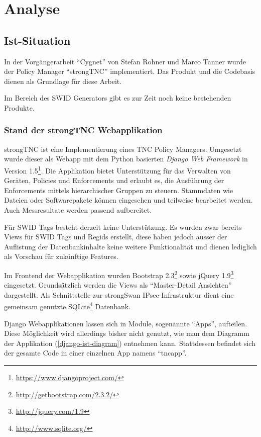 \chapter{Analyse}

\section{Ist-Situation}

In der Vorgängerarbeit \enquote{Cygnet} von Stefan Rohner und Marco
Tanner\cite{cygnet:2013} wurde der Policy Manager \enquote{strongTNC}
implementiert. Das Produkt und die Codebasis dienen als Grundlage
für diese Arbeit.

Im Bereich des SWID Generators gibt es zur Zeit noch keine bestehenden Produkte.

\subsection{Stand der strongTNC Webapplikation} 
\label{analyse:stand}

strongTNC ist eine Implementierung eines TNC Policy Managers. Umgesetzt wurde
dieser als Webapp mit dem Python basierten \textit{Django Web Framework} in
Version 1.5\footnote{\url{https://www.djangoproject.com/}}. Die Applikation
bietet Unterstützung für das Verwalten von Geräten, Policies und Enforcements
und erlaubt es, die Ausführung der Enforcements mittels hierarchischer Gruppen
zu steuern. Stammdaten wie Dateien oder Softwarepakete können eingesehen und
teilweise bearbeitet werden. Auch Messresultate werden passend aufbereitet.

Für SWID Tags besteht derzeit keine Unterstützung. Es wurden zwar bereits Views
für SWID Tags und Regids erstellt, diese haben jedoch ausser der Auflistung der
Datenbankinhalte keine weitere Funktionalität und dienen lediglich als Vorschau
für zukünftige Features.

Im Frontend der Webapplikation wurden Bootstrap
2.3\footnote{\url{http://getbootstrap.com/2.3.2/}} sowie jQuery
1.9\footnote{\url{http://jquery.com/1.9}} eingesetzt. Grundsätzlich werden die
Views als \enquote{Master-Detail Ansichten} dargestellt. Als Schnittstelle zur
strongSwan IPsec Infrastruktur dient eine gemeinsam genutzte
SQLite\footnote{\url{http://www.sqlite.org/}} Datenbank.

Django Webapplikationen lassen sich in Module, sogenannte \enquote{Apps},
aufteilen. Diese Möglichkeit wird allerdings bisher nicht genutzt, wie man dem
Diagramm der Applikation (\autoref{django-ist-diagram}) entnehmen kann.
Stattdessen befindet sich der gesamte Code in einer einzelnen App namens
\enquote{tncapp}.

